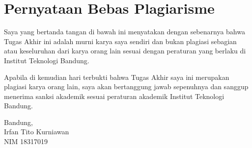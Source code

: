 \chapter*{Pernyataan Bebas Plagiarisme}

Saya yang bertanda tangan di bawah ini menyatakan dengan sebenarnya bahwa Tugas Akhir ini adalah murni karya saya sendiri dan bukan plagiasi sebagian atau keseluruhan dari karya orang lain sesuai dengan peraturan yang berlaku di Institut Teknologi Bandung.

Apabila di kemudian hari terbukti bahwa Tugas Akhir saya ini merupakan plagiasi karya orang lain, saya akan bertanggung jawab sepenuhnya dan sanggup menerima sanksi akademik sesuai peraturan akademik Institut Teknologi Bandung.
\\[\baselineskip]

\hfill
\parbox{5.5cm}{
	Bandung, \thedate \\[2\baselineskip]
	Irfan Tito Kurniawan \\
	NIM 18317019
}


